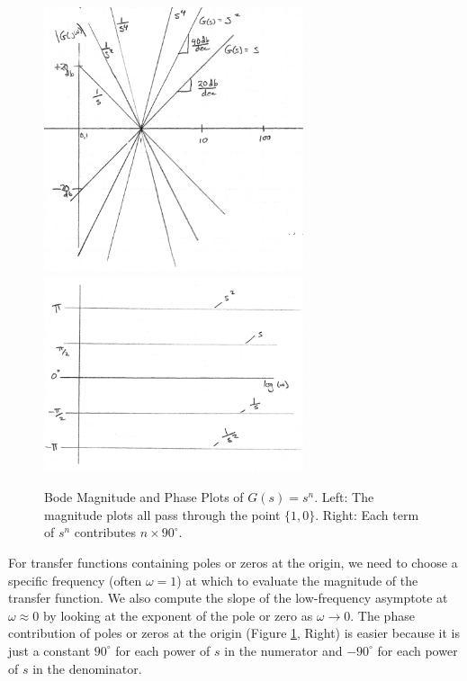 \begin{figure}\centering
\includegraphics[width=3.0in]{figs05/00761a.png}
\includegraphics[width=3.0in]{figs05/00762a.png}
\caption{Bode Magnitude and Phase Plots of $G(s) = s^n$.  Left: The magnitude plots all pass through the point $\{1,0\}$. Right: Each term of $s^n$ contributes $n\times90^\circ$.}\label{bodepolesatorigin}
\end{figure}
%

For transfer functions containing poles or zeros at the origin, we need to choose a specific frequency (often $\omega=1$) at which to evaluate the magnitude of the transfer function.   We also compute the slope of the low-frequency asymptote at $\omega \approx 0$ by looking at the exponent of the pole or zero as $\omega\to 0$.  The phase contribution of poles or zeros at the origin (Figure \ref{bodepolesatorigin}, Right) is easier because it is just a constant $90^\circ$ for each power of $s$ in the numerator and $-90^\circ$ for each power of $s$ in the denominator.


